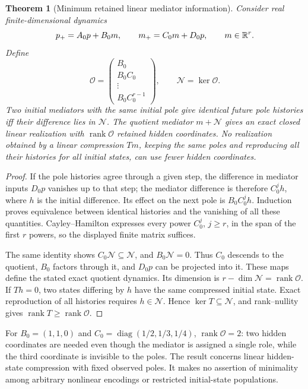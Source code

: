 \documentclass[11pt,letterpaper]{article}
\newcommand{\rank}{\operatorname{rank}}
\newcommand{\diag}{\operatorname{diag}}
\newtheorem{theorem}{Theorem}[section]
\theoremstyle{definition}
\numberwithin{equation}{section}
\begin{document}
\begin{theorem}[Minimum retained linear mediator information]\label{observability}
Consider real finite-dimensional dynamics
\begin{equation}
p_+=A_0p+B_0m,\qquad m_+=C_0m+D_0p,\qquad m\in\mathbb R^r.
\end{equation}
Define
\begin{equation}
\mathcal O=\begin{pmatrix}B_0\\B_0C_0\\\vdots\\B_0C_0^{r-1}\end{pmatrix},\qquad
\mathcal N=\ker\mathcal O.
\end{equation}
Two initial mediators with the same initial pole give identical future pole histories iff their difference lies in $\mathcal N$. The quotient mediator $m+\mathcal N$ gives an exact closed linear realization with $\rank\mathcal O$ retained hidden coordinates. No realization obtained by a linear compression $Tm$, keeping the same poles and reproducing all their histories for all initial states, can use fewer hidden coordinates.
\end{theorem}
\begin{proof}
If the pole histories agree through a given step, the difference in mediator inputs $D_0p$ vanishes up to that step; the mediator difference is therefore $C_0^j h$, where $h$ is the initial difference. Its effect on the next pole is $B_0C_0^jh$. Induction proves equivalence between identical histories and the vanishing of all these quantities. Cayley--Hamilton expresses every power $C_0^j$, $j\geq r$, in the span of the first $r$ powers, so the displayed finite matrix suffices.

The same identity shows $C_0\mathcal N\subseteq\mathcal N$, and $B_0\mathcal N=0$. Thus $C_0$ descends to the quotient, $B_0$ factors through it, and $D_0p$ can be projected into it. These maps define the stated exact quotient dynamics. Its dimension is $r-\dim\mathcal N=\rank\mathcal O$. If $Th=0$, two states differing by $h$ have the same compressed initial state. Exact reproduction of all histories requires $h\in\mathcal N$. Hence $\ker T\subseteq\mathcal N$, and rank--nullity gives $\rank T\geq\rank\mathcal O$.
\end{proof}
For $B_0=(1,1,0)$ and $C_0=\diag(1/2,1/3,1/4)$, $\rank\mathcal O=2$: two hidden coordinates are needed even though the mediator is assigned a single role, while the third coordinate is invisible to the poles. The result concerns linear hidden-state compression with fixed observed poles. It makes no assertion of minimality among arbitrary nonlinear encodings or restricted initial-state populations.
\end{document}
